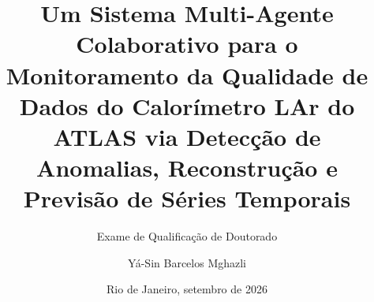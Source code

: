 
\title[Sistema Multi-Agente para DQM no ATLAS]{%
  Um Sistema Multi-Agente Colaborativo para o Monitoramento da
  Qualidade de Dados do Calorímetro LAr do ATLAS via Detecção de
  Anomalias, Reconstrução e Previsão de Séries Temporais}

\subtitle{Exame de Qualificação de Doutorado}

\author[Yá-Sin B. Mghazli]{Yá-Sin Barcelos Mghazli}


\date{Rio de Janeiro, setembro de 2026}

\newcommand{\orientadores}{%
  Prof. José Manoel de Seixas, D.Sc.\\
  Prof. Juan Lieber Marin, D.Sc.}

\newcommand{\bancaexaminadora}{%
  Prof. José Manoel de Seixas, D.Sc.\\
  Prof. Juan Lieber Marin, D.Sc.\\
  Prof. José Gabriel Rodríguez Carneiro Gomes, D.Sc.\\
  Prof. Edmar Egidio Purcino de Souza, D.Sc.\\
  Prof. Tiago Alessandro Espinola Ferreira, D.Sc.}
